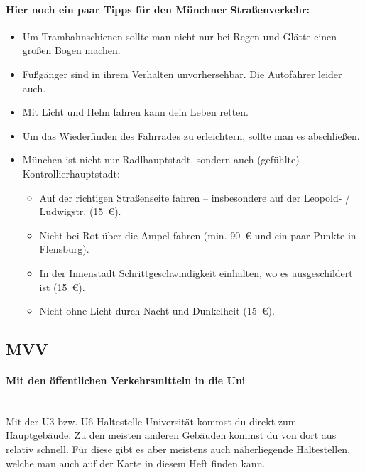 \documentclass[twoside,12pt,parskip=half-]{scrartcl}
\begin{document}
\paragraph{Hier noch ein paar Tipps für den Münchner Straßenverkehr:}
\begin{itemize}
	\item Um Trambahnschienen sollte man nicht nur bei Regen und Glätte einen großen Bogen machen.
	\item Fußgänger sind in ihrem Verhalten unvorhersehbar. Die Autofahrer leider auch.
	\item Mit Licht und Helm fahren kann dein Leben retten.
	\item Um das Wiederfinden des Fahrrades zu erleichtern, sollte man es abschließen.
	\item München ist nicht nur Radlhauptstadt, sondern auch (gefühlte) Kontrollierhauptstadt:

	\begin{itemize}
        	\item Auf der richtigen Straßenseite fahren -- insbesondere auf der Leopold- / Ludwigstr. (15~€).
	        \item Nicht bei Rot über die Ampel fahren (min. 90~€ und ein paar Punkte in Flensburg).
	        \item In der Innenstadt Schrittgeschwindigkeit einhalten, wo es ausgeschildert ist (15~€).
	        \item Nicht ohne Licht durch Nacht und Dunkelheit (15~€).
	\end{itemize}
\end{itemize}


\clearpage

\subsection{MVV}

\paragraph{Mit den öffentlichen Verkehrsmitteln in die Uni}\hfill\\
Mit der U3 bzw. U6 Haltestelle Universität kommst du direkt zum Hauptgebäude. Zu den meisten anderen Gebäuden kommst du von dort aus relativ schnell. Für diese gibt es aber meistens auch näherliegende Haltestellen, welche man auch auf der Karte in diesem Heft finden kann.
\end{document}
